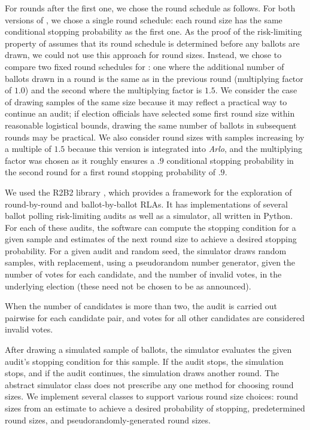 For rounds after the first one, we chose the round schedule as follows. For both versions of \BRAVO, we chose a single round schedule: each round size has the same conditional stopping probability as the first one. As the proof of the risk-limiting property of \Minerva assumes that its round schedule is determined before any ballots are drawn, we could not use this approach for \Minerva round sizes. Instead, we chose to compare two fixed round schedules for \Minerva: one where the additional number of ballots drawn in a round is the same as in the previous round (multiplying factor of $1.0$) and the second where the multiplying factor is $1.5$. We consider the case of drawing samples of the same size because it may reflect a practical way to continue an
audit; if election officials have selected some first round size within
reasonable logistical bounds, drawing the same number of 
ballots in subsequent rounds may be practical.
We also consider round sizes with samples increasing by a multiple
of $1.5$ because this version is integrated into {\em Arlo}, and the multiplying factor was chosen as it roughly ensures a $.9$ conditional stopping probability in the second round for a first round stopping probability of $.9$. 

We used the R2B2 library \cite{r2b2_anon}, which provides a framework for the exploration of round-by-round
and ballot-by-ballot RLAs. It has implementations of several ballot polling risk-limiting audits as well as a simulator, 
all written in Python. For each of these audits, the software can compute the stopping condition for a given sample and estimates
of the next round size to achieve a desired stopping probability. 
For a given audit and random seed, the simulator draws random samples, with replacement, using a pseudorandom number generator, given the number of votes for each candidate, and the number of invalid votes, in the underlying election (these need not be chosen to be as announced). 

When the number of candidates is more than two, the audit is carried out pairwise for each candidate pair, and votes for all other candidates are considered invalid votes. 

After drawing a simulated sample of ballots, the simulator evaluates the given audit's stopping condition for this sample.
If the audit stops, the simulation stops, and if the audit continues, the simulation draws another round. 
The abstract simulator class does not prescribe any one method for choosing round sizes. 
We implement several classes to support various round size choices: 
round sizes from an estimate to achieve a desired probability of stopping, 
predetermined round sizes, and pseudorandomly-generated round sizes. 
